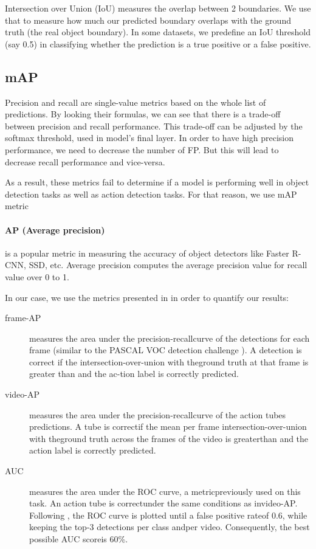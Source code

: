 \documentclass{report}
\begin{document}
Intersection over Union (IoU)  measures the overlap between 2 boundaries. We use that to measure how much our predicted boundary overlaps with the ground truth (the real object boundary).
In some datasets, we predefine an IoU threshold (say 0.5) in classifying whether the prediction is a true positive or a false positive.


\subsection{mAP}
Precision and recall are single-value metrics based on the whole list of predictions. By looking their formulas, we can see that there is
a trade-off between precision and recall performance. This trade-off can be adjusted by the softmax threshold, used in model's final layer.
In order to have high precision performance, we need to decrease the number of FP. But this will lead to decrease recall performance and
vice-versa. \par
As a result, these metrics fail to determine if a model is performing well in object detection tasks as well as action detection tasks. For
that reason, we use mAP metric
\paragraph{AP (Average precision)} is a popular metric in measuring the accuracy of object detectors like Faster R-CNN, SSD, etc. Average precision computes the average precision value for recall value over 0 to 1.

In our case, we use the metrics presented in \cite{DBLP:journals/corr/GkioxariM14} in
order to quantify our results:
\begin{description}
\item[ frame-AP ] measures the area under the precision-recallcurve of the detections for each frame (similar to the PASCAL  VOC  detection  challenge  \cite{Everingham10}).   A  detection is correct
  if the intersection-over-union with theground truth at that frame is greater than and the ac-tion label is correctly predicted.
\item [ video-AP ] measures the area under the precision-recallcurve of the action tubes predictions. A tube is correctif the mean per frame intersection-over-union with theground truth across the
  frames of the video is greaterthan and the action label is correctly predicted.
\item [ AUC ] measures the area under the ROC curve, a metricpreviously used on this task.  An action tube is correctunder the same conditions as invideo-AP. Following
  \cite{Tian:2013:SDP:2514950.2515975} , the ROC curve is plotted until a false positive rateof 0.6, while keeping the top-3 detections per class andper video. Consequently,
  the best possible AUC scoreis 60\%.
\end{description}
\end{document}
